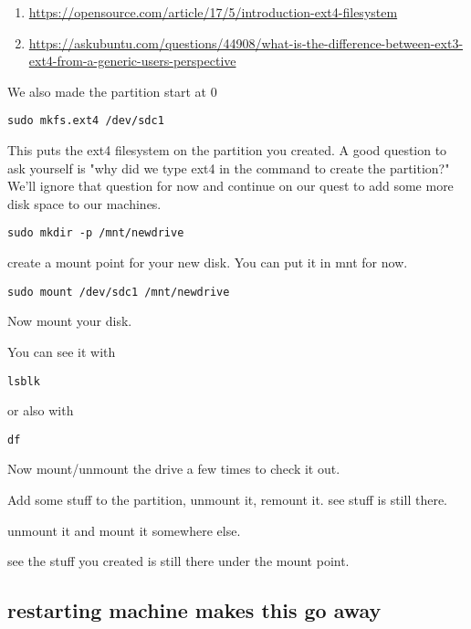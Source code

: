 \documentclass[10pt]{article}
\begin{document}
\begin{enumerate}
\item\url{https://opensource.com/article/17/5/introduction-ext4-filesystem}
\item\url{https://askubuntu.com/questions/44908/what-is-the-difference-between-ext3-ext4-from-a-generic-users-perspective}
\end{enumerate}

We also made the partition start at 0%

\begin{lstlisting}
sudo mkfs.ext4 /dev/sdc1
\end{lstlisting}

This puts the ext4 filesystem on the partition you created. A good question to ask yourself is "why did we type ext4 in the command to create the partition?" We'll ignore that question for now and continue on our quest to add some more disk space to our machines.

\begin{lstlisting}
sudo mkdir -p /mnt/newdrive
\end{lstlisting}

create a mount point for your new disk. You can put it in mnt for now.

\begin{lstlisting}
sudo mount /dev/sdc1 /mnt/newdrive
\end{lstlisting}

Now mount your disk. 

You can see it with 

\begin{lstlisting}
lsblk
\end{lstlisting}

or also with

\begin{lstlisting}
df
\end{lstlisting}

Now mount/unmount the drive a few times to check it out.

Add some stuff to the partition, unmount it, remount it. see stuff is still there.

unmount it and mount it somewhere else. 

see the stuff you created is still there under the mount point.

\subsection{ restarting machine makes this go away}
\end{document}
